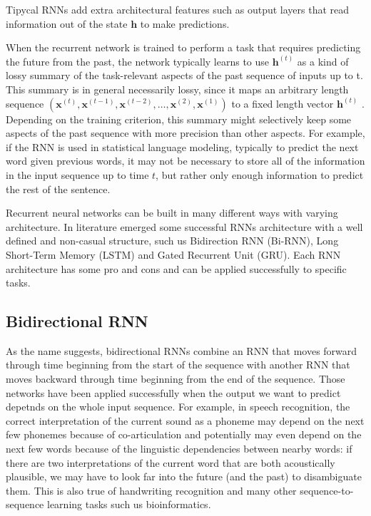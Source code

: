 Tipycal RNNs add extra architectural features such as output layers
that read information out of the state $\bm{h}$ to make predictions.

When the recurrent network is trained to perform a task that requires
predicting the future from the past, the network typically learns to
use $\bm{h}^{(t)}$ as a kind of lossy summary of the task-relevant
aspects of the past sequence of inputs up to t. This summary is in
general necessarily lossy, since it maps an arbitrary length sequence
$( \bm{x}^{(t)}, \bm{x}^{(t-1)}, \bm{x}^{(t-2)} , \ldots ,
\bm{x}^{(2)}, \bm{x}^{(1)} )$ to a ﬁxed length vector $\bm{h}^{(t)}$ .
Depending on the training criterion, this summary might selectively
keep some aspects of the past sequence with more precision than other
aspects. For example, if the RNN is used in statistical language
modeling, typically to predict the next word given previous words, it
may not be necessary to store all of the information in the input
sequence up to time $t$, but rather only enough information to predict
the rest of the sentence.

Recurrent neural networks can be built in many diﬀerent ways with
varying architecture. In literature emerged some successful RNNs
architecture with a well defined and non-casual structure, such us
Bidirection RNN (Bi-RNN), Long Short-Term Memory (LSTM) and Gated
Recurrent Unit (GRU). Each RNN architecture has some pro and cons and
can be applied successfully to specific tasks.

\subsection{Bidirectional RNN}

As the name suggests, bidirectional RNNs combine an RNN that moves
forward through time beginning from the start of the sequence with
another RNN that moves backward through time beginning from the end of
the sequence. Those networks have been applied successfully when the
output we want to predict depetnds on the whole input sequence. For
example, in speech recognition, the correct interpretation of the
current sound as a phoneme may depend on the next few phonemes because
of co-articulation and potentially may even depend on the next few
words because of the linguistic dependencies between nearby words: if
there are two interpretations of the current word that are both
acoustically plausible, we may have to look far into the future (and
the past) to disambiguate them. This is also true of handwriting
recognition and many other sequence-to-sequence learning tasks such us
bioinformatics.


